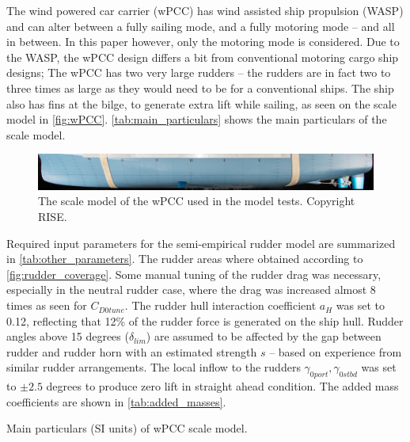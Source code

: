 The wind powered car carrier (wPCC) has wind assisted ship propulsion (WASP) and can alter between a fully sailing mode, and a fully motoring mode -- and all in between. 
In this paper however, only the motoring mode is considered. Due to the WASP, the wPCC design differs a bit from conventional motoring cargo ship designs; The wPCC has two very large rudders -- the rudders are in fact two to three times as large as they would need to be for a conventional ships. The ship also has fins at the bilge, to generate extra lift while sailing, as seen on the scale model in \autoref{fig:wPCC}. 
\autoref{tab:main_particulars} shows the main particulars of the scale model. 
\begin{figure}[h]
    \centering
    \includegraphics[width=\columnwidth]{figures/5m2.jpg}
    \caption{The scale model of the wPCC used in the model tests. Copyright RISE.}
    \label{fig:wPCC}
\end{figure}

Required input parameters for the semi-empirical rudder model are summarized in \autoref{tab:other_parameters}.
The rudder areas where obtained according to \autoref{fig:rudder_coverage}.   
Some manual tuning of the rudder drag was necessary, especially in the neutral rudder case, where the drag was increased almost 8 times as seen for $C_{D0tune}$. The rudder hull interaction coefficient $a_H$ was set to 0.12, reflecting that 12\% of the rudder force is generated on the ship hull.
Rudder angles above 15 degrees ($\delta_{lim}$) are assumed to be affected by the gap between rudder and rudder horn with an estimated strength $s$ -- based on experience from similar rudder arrangements.
The local inflow to the rudders $\gamma_{0port},\gamma_{0stbd}$ was set to $\pm 2.5$ degrees to produce zero lift in straight ahead condition.
The added mass coefficients are shown in \autoref{tab:added_masses}.
\begin{table}[h]
    \centering
    \caption{Main particulars (SI units) of wPCC scale model.}
    \label{tab:main_particulars}
\end{table}